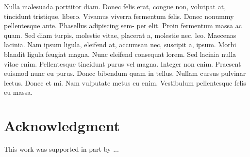 \newcommand{\hackdocumentclass}{\documentclass}
\begin{document}
Nulla malesuada porttitor diam. Donec felis erat, congue non, volutpat
at, tincidunt tristique, libero. Vivamus viverra fermentum felis. Donec
nonummy pellentesque ante. Phasellus adipiscing sem- per elit. Proin
fermentum massa ac quam. Sed diam turpis, molestie vitae, placerat a,
molestie nec, leo. Maecenas lacinia. Nam ipsum ligula, eleifend at,
accumsan nec, suscipit a, ipsum. Morbi blandit ligula feugiat magna. Nunc
eleifend consequat lorem. Sed lacinia nulla vitae enim. Pellentesque
tincidunt purus vel magna. Integer non enim. Praesent euismod nunc eu
purus. Donec bibendum quam in tellus. Nullam cursus pulvinar lectus.
Donec et mi. Nam vulputate metus eu enim. Vestibulum pellentesque felis
eu massa.









\section*{Acknowledgment}

This work was supported in part by ...


\balance

\end{document}
